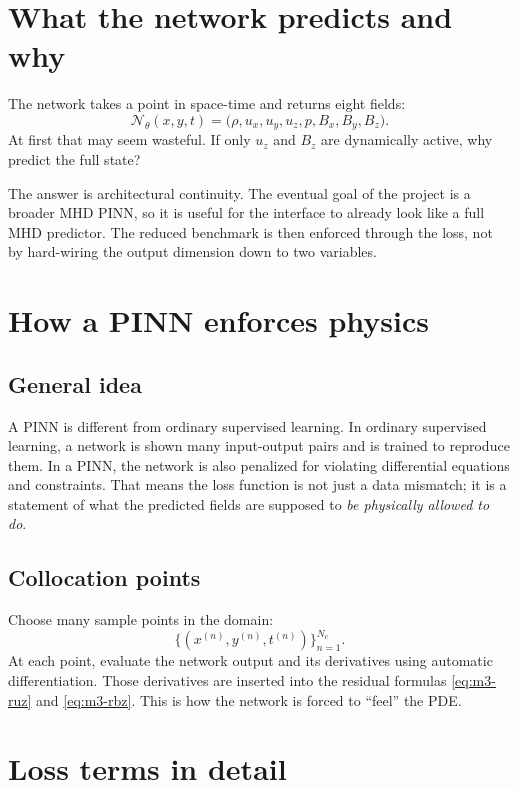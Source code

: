 \documentclass[11pt]{article}
\begin{document}
\section{What the network predicts and why}
The network takes a point in space-time and returns eight fields:
\begin{equation}
\mathcal{N}_{\theta}(x,y,t)
=
\bigl(
\rho,
u_x,u_y,u_z,
p,
B_x,B_y,B_z
\bigr).
\label{eq:m3-net}
\end{equation}
At first that may seem wasteful. If only $u_z$ and $B_z$ are dynamically active, why predict the full state?

The answer is architectural continuity. The eventual goal of the project is a broader MHD PINN, so it is useful for the interface to already look like a full MHD predictor. The reduced benchmark is then enforced through the loss, not by hard-wiring the output dimension down to two variables.

\section{How a PINN enforces physics}

\subsection{General idea}
A PINN is different from ordinary supervised learning. In ordinary supervised learning, a network is shown many input-output pairs and is trained to reproduce them. In a PINN, the network is also penalized for violating differential equations and constraints. That means the loss function is not just a data mismatch; it is a statement of what the predicted fields are supposed to \emph{be physically allowed to do}.

\subsection{Collocation points}
Choose many sample points in the domain:
\begin{equation}
\{(x^{(n)},y^{(n)},t^{(n)})\}_{n=1}^{N_c}.
\end{equation}
At each point, evaluate the network output and its derivatives using automatic differentiation. Those derivatives are inserted into the residual formulas \eqref{eq:m3-ruz} and \eqref{eq:m3-rbz}. This is how the network is forced to ``feel'' the PDE.

\section{Loss terms in detail}
\end{document}
